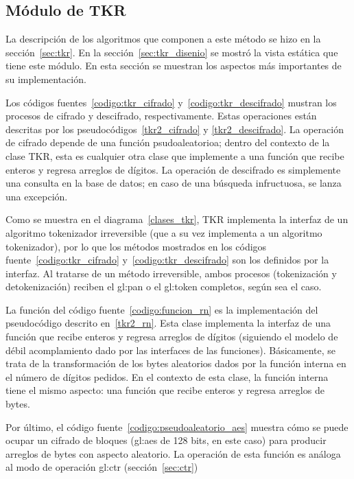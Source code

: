 %
%
%

\subsection{Módulo de TKR}

La descripción de los algoritmos que componen a este método se hizo en la
sección~\ref{sec:tkr}. En la sección~\ref{sec:tkr_disenio} se mostró la vista
estática que tiene este módulo. En esta sección se muestran los aspectos más
importantes de su implementación.



Los códigos fuentes~\ref{codigo:tkr_cifrado} y~\ref{codigo:tkr_descifrado}
mustran los procesos de cifrado y descifrado, respectivamente. Estas operaciones
están descritas por los pseudocódigos~\ref{tkr2_cifrado} y
\ref{tkr2_descifrado}. La operación de cifrado depende de una función
psudoaleatorioa; dentro del contexto de la clase TKR, esta es cualquier
otra clase que implemente a una función que recibe enteros y regresa
arreglos de dígitos. La operación de descifrado es simplemente una consulta
en la base de datos; en caso de una búsqueda infructuosa, se lanza una
excepción.

Como se muestra en el diagrama~\ref{clases_tkr}, TKR implementa la interfaz
de un algoritmo tokenizador irreversible (que a su vez implementa a un
algoritmo tokenizador), por lo que los métodos mostrados en los códigos
fuente~\ref{codigo:tkr_cifrado} y~\ref{codigo:tkr_descifrado} son
los definidos por la interfaz. Al tratarse de un método irreversible,
ambos procesos (tokenización y detokenización) reciben el \gls{gl:pan} o el
\gls{gl:token} completos, según sea el caso.


La función del código fuente~\ref{codigo:funcion_rn} es la implementación del
pseudocódigo descrito en~\ref{tkr2_rn}. Esta clase implementa la
interfaz de una función que recibe enteros y regresa arreglos de dígitos
(siguiendo el modelo de débil acomplamiento dado por las interfaces de
las funciones). Básicamente, se trata de la transformación de
los bytes aleatorios dados por la función interna en el número de
dígitos pedidos. En el contexto de esta clase, la función interna tiene
el mismo aspecto: una función que recibe enteros y regresa arreglos de bytes.


Por último, el código fuente~\ref{codigo:pseudoaleatorio_aes} muestra
cómo se puede ocupar un cifrado de bloques (\gls{gl:aes} de 128 bits, en
este caso) para producir arreglos de bytes con aspecto aleatorio. La
operación de esta función es análoga al modo de operación \gls{gl:ctr}
(sección~\ref{sec:ctr})
